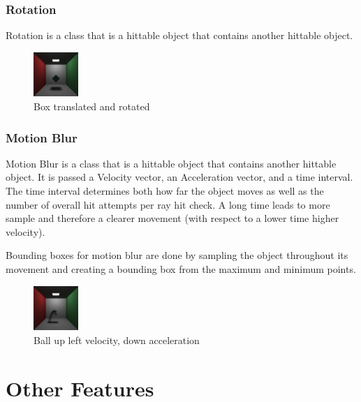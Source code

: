 \documentclass{article}
\begin{document}
        \subsubsection{Rotation}
        Rotation is a class that is a hittable object that contains another hittable object. \par
        \begin{figure}[H]
            \centering
            \includegraphics[width=0.15\textwidth]{samples/Instancing.png}
            \caption{Box translated and rotated}
        \end{figure}


        \subsubsection{Motion Blur}
        Motion Blur is a class that is a hittable object that contains another hittable object. It is passed a Velocity vector, an Acceleration vector, and a time interval. The time interval determines both how far the object moves as well as the number of overall hit attempts per ray hit check. A long time leads to more sample and therefore a clearer movement (with respect to a lower time higher velocity).\par 
        Bounding boxes for motion blur are done by sampling the object throughout its movement and creating a bounding box from the maximum and minimum points. \par

        \begin{figure}[H]
            \centering
            \includegraphics[width=0.15\textwidth]{samples/MotionBlur.png}
            \caption{Ball up left velocity, down acceleration}
        \end{figure}



\section{Other Features}
\end{document}
